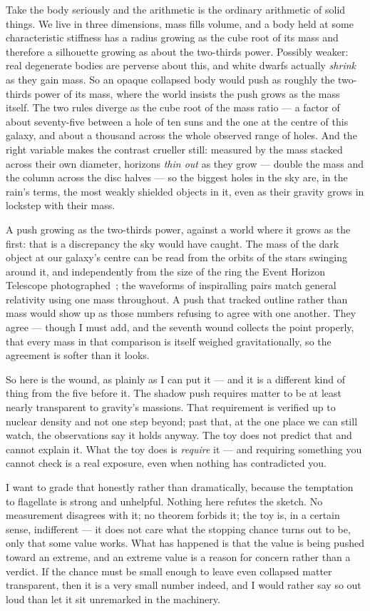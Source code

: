 \documentclass[fontsize=11pt,paper=a4,pagesize=auto,parskip=half-]{scrbook}
\begin{document}
Take the body seriously and the arithmetic is the ordinary arithmetic of solid things. We live in three dimensions, mass fills volume, and a body held at some characteristic stiffness has a radius growing as the cube root of its mass and therefore a silhouette growing as about the two-thirds power. Possibly weaker: real degenerate bodies are perverse about this, and white dwarfs actually \emph{shrink} as they gain mass. So an opaque collapsed body would push as roughly the two-thirds power of its mass, where the world insists the push grows as the mass itself. The two rules diverge as the cube root of the mass ratio --- a factor of about seventy-five between a hole of ten suns and the one at the centre of this galaxy, and about a thousand across the whole observed range of holes. And the right variable makes the contrast crueller still: measured by the mass stacked across their own diameter, horizons \emph{thin out} as they grow --- double the mass and the column across the disc halves --- so the biggest holes in the sky are, in the rain's terms, the most weakly shielded objects in it, even as their gravity grows in lockstep with their mass.

A push growing as the two-thirds power, against a world where it grows as the first: that is a discrepancy the sky would have caught. The mass of the dark object at our galaxy's centre can be read from the orbits of the stars swinging around it, and independently from the size of the ring the Event Horizon Telescope photographed~\cite{eht2022}; the waveforms of inspiralling pairs match general relativity using one mass throughout. A push that tracked outline rather than mass would show up as those numbers refusing to agree with one another. They agree --- though I must add, and the seventh wound collects the point properly, that every mass in that comparison is itself weighed gravitationally, so the agreement is softer than it looks.

So here is the wound, as plainly as I can put it --- and it is a different kind of thing from the five before it. The shadow push requires matter to be at least nearly transparent to gravity's massions. That requirement is verified up to nuclear density and not one step beyond; past that, at the one place we can still watch, the observations say it holds anyway. The toy does not predict that and cannot explain it. What the toy does is \emph{require} it --- and requiring something you cannot check is a real exposure, even when nothing has contradicted you.

I want to grade that honestly rather than dramatically, because the temptation to flagellate is strong and unhelpful. Nothing here refutes the sketch. No measurement disagrees with it; no theorem forbids it; the toy is, in a certain sense, indifferent --- it does not care what the stopping chance turns out to be, only that some value works. What has happened is that the value is being pushed toward an extreme, and an extreme value is a reason for concern rather than a verdict. If the chance must be small enough to leave even collapsed matter transparent, then it is a very small number indeed, and I would rather say so out loud than let it sit unremarked in the machinery.
\end{document}

